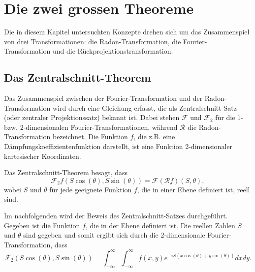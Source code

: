 %
%
%
%
\section{Die zwei grossen Theoreme
	\label{ct:section:theoreme}}
Die in diesem Kapitel untersuchten Konzepte drehen sich um das Zusammenspiel von drei Transformationen: die Radon-Transformation, die Fourier-Transformation und die Rückprojektionstransformation.

\subsection{Das Zentralschnitt-Theorem
	\label{ct:subsection:zentralschnitt}}
Das Zusammenspiel zwischen der Fourier-Transformation und der Radon-Transformation wird durch eine Gleichung erfasst, die als Zentralschnitt-Satz (oder zentraler Projektionssatz) bekannt ist. Dabei stehen $\mathscr{F}$ und $\mathscr{F_2}$ für die 1- bzw. 2-dimensionalen Fourier-Transformationen, während $\mathscr{R}$ die Radon-Transformation bezeichnet. Die Funktion $f$, die z.B. eine Dämpfungskoeffizientenfunktion darstellt, ist eine Funktion 2-dimensionaler kartesischer Koordinaten.

Das Zentralschnitt-Theorem besagt, dass
\begin{equation}\label{2dFourier1}
	\mathscr{F}_2f(S\cos(\theta), S\sin(\theta)) = \mathscr{F}(\mathscr{R}f)(S, \theta),
\end{equation}
wobei $S$ und $\theta$ für jede geeignete Funktion $f$, die in einer Ebene definiert ist, reell sind.

Im nachfolgenden wird der Beweis des Zentralschnitt-Satzes durchgeführt. Gegeben ist die Funktion $f$, die in der Ebene definiert ist. Die reellen Zahlen $S$ und $\theta$ sind gegeben und somit ergibt sich durch die 2-dimensionale Fourier-Transformation, dass
\begin{equation}\label{2dFourier2}
	\mathscr{F}_2(S\cos(\theta), S\sin(\theta)) = \int_{-\infty}^{\infty}\int_{-\infty}^{\infty} f(x, y)e^{-iS(x\cos(\theta)+y\sin(\theta))}dxdy.
\end{equation}


